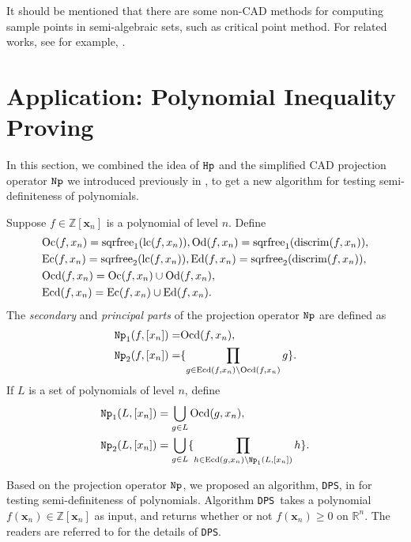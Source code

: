 \documentclass[amsthm]{elsart}
\def \discrim  {{\rm discrim}}
\def \sqrfree  {{\rm sqrfree}}
\def \lc  {{\rm lc}}
\def  \Nproj {{\tt Np}}
\def  \Hproj {{\tt Hp}}
\def \Proineq {{\tt DPS}}
\def \RR {{\mathbb R}}
\def \ZZ {{\mathbb Z}}
\newcommand{\xx}{\bm{x}}
\begin{document}
\begin{rem}
It should be mentioned that there are some non-CAD methods for computing sample points in semi-algebraic sets, such as critical point method. For related works, see for example, \cite{basu1998new,safey2003polar,el2007testing,faugere2008classification,Hong_Safey2012}.
\end{rem}

\section{Application: Polynomial Inequality Proving}
\label{sec:improved}
In this section, we combined the idea of $\Hproj$ and the simplified CAD projection operator $\Nproj$ we introduced previously in \cite{han2016proving}, to get a new algorithm for testing semi-definiteness of polynomials.
\begin{defn} \citep{han2016proving}
        Suppose $f\in \ZZ[\xx_{n}]$ is a polynomial of level $n$. Define   \begin{align*}
                & {\rm Oc}(f,x_n)=\sqrfree_1(\lc(f,x_{n})), {\rm Od}(f,x_n)=\sqrfree_1(\discrim(f,x_{n})),\\
                & {\rm Ec}(f,x_n)=\sqrfree_2(\lc(f,x_{n})), {\rm Ed}(f,x_n)=\sqrfree_2(\discrim(f,x_{n})),\\
                & {\rm Ocd}(f,x_n)={\rm Oc}(f,x_n)\cup {\rm Od}(f,x_n),\\
                & {\rm Ecd}(f,x_n)={\rm Ec}(f,x_n)\cup {\rm Ed}(f,x_n).
        \end{align*}
        The {\em secondary} and {\em principal parts} of the projection operator $\Nproj$ are defined as
\begin{align*}
                \Nproj_1(f,[x_{n}])=&{\rm Ocd}(f,x_n),\\
                \Nproj_{2}(f,[x_{n}])=&\{\prod_{g\in {\rm Ecd}(f,x_{n})\setminus {\rm Ocd}(f,x_{n})}{g}\}.
        \end{align*}
        If $L$ is a set of polynomials of level $n$, define
        \begin{align*}
                \Nproj_1(L,[x_{n}])&=\bigcup_{g\in L}{\rm Ocd}(g,x_{n}),\\
                \Nproj_{2}(L,[x_{n}])&=\bigcup_{g\in L}\{\prod_{h\in {\rm Ecd}(g,x_n)\setminus \Nproj_1(L,[x_{n}])}{h}\}.
        \end{align*}
\end{defn}
Based on the projection operator $\Nproj$, we proposed an algorithm, \Proineq, in \citep{han2016proving} for testing semi-definiteness of polynomials. Algorithm \Proineq\ takes a polynomial $f(\xx_n) \in \ZZ[\xx_n]$ as input, and returns whether or not $f(\xx_n) \ge0$ on $\RR^n$.
The readers are referred to \citep{han2016proving} for the details of \Proineq.
\end{document}
